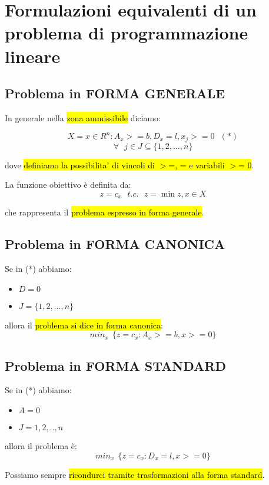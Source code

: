 \newpage
\section{Formulazioni equivalenti di un problema di programmazione lineare}


\subsection{Problema in FORMA GENERALE}

In generale nella \hl{zona ammissibile} diciamo:

$$X={x \in R^n : A_x >= b, D_x = l, x_j >= 0}\ \ \ (*)$$
$$\forall\ \ \ j \in J \subseteq \{1,2,...,n\}$$

dove \hl{definiamo la possibilita' di vincoli di $>$=, = e variabili $>$= 0}.

La funzione obiettivo è definita da: $$z = c_x\ \ \ t.c.\ \ \ z = \min z, x \in X$$

che rappresenta il \hl{problema espresso in forma generale}.


\subsection{Problema in FORMA CANONICA}

Se in (*) abbiamo:

\begin{itemize}
	\item $D = 0$
	\item $J = \{1,2,...,n\}$
\end{itemize}

allora il \hl{problema si dice in forma canonica}: $$min_x\ \ \{z = c_x : A_x >= b, x >= 0\}$$


\subsection{Problema in FORMA STANDARD}

Se in (*) abbiamo:

\begin{itemize}
	\item $A = 0$
	\item $J = {1,2,..,n}$
\end{itemize}

allora il problema è: $$min_x\ \ \{z = c_x: D_x = l, x >= 0\}$$

Possiamo sempre \hl{ricondurci tramite trasformazioni alla forma standard}.


